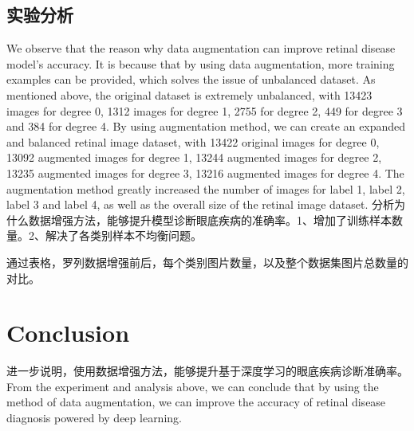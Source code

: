 \documentclass{ijisa}
\begin{document}
\subsection{实验分析}
We observe that the reason why data augmentation can improve retinal disease model's accuracy. It is because that by using data augmentation, more training examples can be provided, which solves the issue of unbalanced dataset. As mentioned above, the original dataset is extremely unbalanced, with 13423 images for degree 0, 1312 images for degree 1, 2755 for degree 2, 449 for degree 3 and 384 for degree 4. By using augmentation method, we can create an expanded and balanced retinal image dataset, with 13422 original images for degree 0, 13092 augmented images for degree 1, 13244 augmented images for degree 2, 13235 augmented images for degree 3, 13216 augmented images for degree 4. The augmentation method greatly increased the number of images for label 1, label 2, label 3 and label 4, as well as the overall size of the retinal image dataset. 
分析为什么数据增强方法，能够提升模型诊断眼底疾病的准确率。1、增加了训练样本数量。2、解决了各类别样本不均衡问题。

通过表格，罗列数据增强前后，每个类别图片数量，以及整个数据集图片总数量的对比。

\section{Conclusion}
进一步说明，使用数据增强方法，能够提升基于深度学习的眼底疾病诊断准确率。
From the experiment and analysis above, we can conclude that by using the method of data augmentation, we can improve the accuracy of retinal disease diagnosis powered by deep learning.



   
\end{document}
